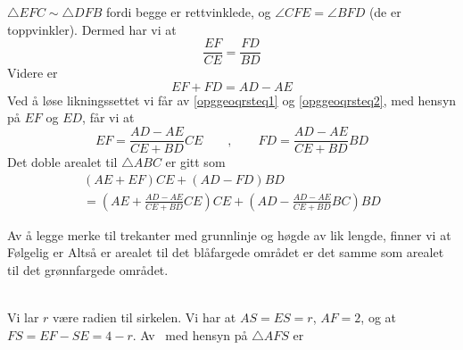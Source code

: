$ {\triangle EFC \sim \triangle DFB} $ fordi begge er rettvinklede, og $ {\angle CFE = \angle BFD}$ (de er toppvinkler). Dermed har vi at
\begin{equation}\label{opggeoqrsteq1}
	\frac{EF}{CE}=\frac{FD}{BD} 
\end{equation}
Videre er
\begin{equation}\label{opggeoqrsteq2}
	EF+FD= AD-AE
\end{equation}
Ved å løse likningssettet vi får av \eqref{opggeoqrsteq1} og \eqref{opggeoqrsteq2}, med hensyn på $ EF $ og $ ED $, får vi at
\[ 
EF = \frac{AD-AE}{CE+BD}CE\qquad,\qquad  FD=\frac{AD-AE}{CE+BD}BD
\]
Det doble arealet til $ \triangle ABC $ er gitt som
\begin{multline*}
(AE+EF)CE+(AD-FD)BD \\=\left(AE+\frac{AD-AE}{CE+BD}CE\right)CE+\left(AD-\frac{AD-AE}{CE+BD}BC\right)BD	
\end{multline*}

\newpage
{}
Av å legge merke til trekanter med grunnlinje og høgde av lik lengde, finner vi at
Følgelig er
Altså er arealet til det blåfargede området er det samme som arealet til det grønnfargede området.\vsk


\\
Vi lar $ r $ være radien til sirkelen. Vi har at $ AS=ES=r $, $ AF=2 $, og at $ FS=EF-SE=4-r $. Av \pyt\ med hensyn på $ \triangle AFS $ er
\newpage


